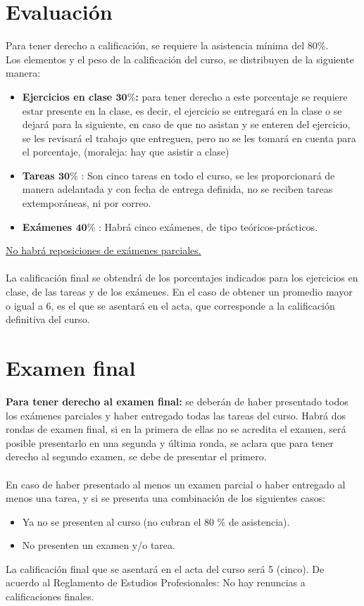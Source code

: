 \documentclass[12pt]{article}
\begin{document}
\section{Evaluación}
Para tener derecho a calificación, se requiere la asistencia mínima del 80\%.
\\
\bigskip
Los elementos y el peso de la calificación del curso, se distribuyen de la siguiente manera:
\begin{itemize}
\item \textbf{Ejercicios en clase $\mathbf{30\%}$:} para tener derecho a este porcentaje se requiere estar presente en la clase, es decir, el ejercicio se entregará en la clase o se dejará para la siguiente, en caso de que no asistan y se enteren del ejercicio, se les revisará el trabajo que entreguen, pero no se les tomará en cuenta para el porcentaje, (moraleja: hay que asistir a clase) 
\item \textbf{Tareas $\mathbf{30\%}$} : Son cinco tareas en todo el curso, se les proporcionará de manera adelantada y con fecha de entrega definida, no se reciben tareas extemporáneas, ni por correo.
\item \textbf{Exámenes $\mathbf{40\%}$} : Habrá cinco exámenes, de tipo teóricos-prácticos. 
\end{itemize}
\underline{No habrá reposiciones de exámenes parciales.}
\\
\\
La calificación final se obtendrá de los porcentajes indicados para los ejercicios en clase, de las tareas y de los exámenes. En el caso de obtener un promedio mayor o igual a 6, es el que se asentará en el acta, que corresponde a la calificación definitiva del curso.
\section{Examen final}
\textbf{Para tener derecho al examen final:} se deberán de haber presentado todos los exámenes parciales y haber entregado todas las tareas del curso. Habrá dos rondas de examen final, si en la primera de ellas no se acredita el examen, será posible presentarlo en una segunda y última ronda, se aclara que para tener derecho al segundo examen, se debe de presentar el primero.
\\
\\
En caso de haber presentado al menos un examen parcial o haber entregado al menos una tarea, y si se presenta una combinación de los siguientes casos:
\begin{itemize}
\item Ya no se presenten al curso (no cubran el 80 \% de asistencia).
\item No presenten un examen y/o tarea.
\end{itemize}
La calificación final que se asentará en el acta del curso será 5 (cinco). De acuerdo al Reglamento de Estudios Profesionales: No hay renuncias a calificaciones finales.
\end{document}
